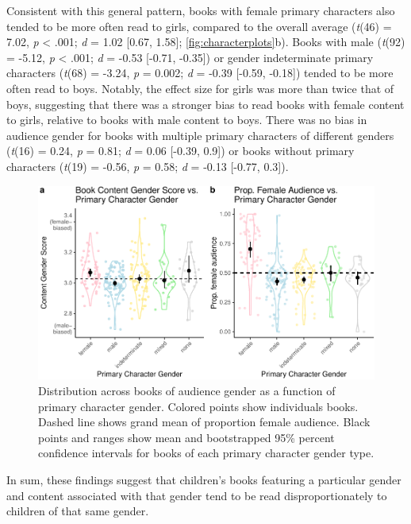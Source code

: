 \documentclass[
  english,
  ,man,floatsintext]{apa6}
\begin{document}
Consistent with this general pattern, books with female primary characters also tended to be more often read to girls, compared to the overall average (\emph{t}(46) = 7.02, \emph{p} \textless{} .001; \emph{d} = 1.02 {[}0.67, 1.58{]}; \autoref{fig:characterplots}b). Books with male (\emph{t}(92) = -5.12, \emph{p} \textless{} .001; \emph{d} = -0.53 {[}-0.71, -0.35{]}) or gender indeterminate primary characters (\emph{t}(68) = -3.24, \emph{p} = 0.002; \emph{d} = -0.39 {[}-0.59, -0.18{]}) tended to be more often read to boys. Notably, the effect size for girls was more than twice that of boys, suggesting that there was a stronger bias to read books with female content to girls, relative to books with male content to boys. There was no bias in audience gender for books with multiple primary characters of different genders (\emph{t}(16) = 0.24, \emph{p} = 0.81; \emph{d} = 0.06 {[}-0.39, 0.9{]}) or books without primary characters (\emph{t}(19) = -0.56, \emph{p} = 0.58; \emph{d} = -0.13 {[}-0.77, 0.3{]}).

\begin{figure}[t!]
\includegraphics{kidbookgender_psych_sci_files/figure-latex/characterplots-1} \caption{Distribution across books of audience gender as a function of primary character gender. Colored points show individuals books. Dashed line shows grand mean of proportion female audience. Black points and ranges show mean and bootstrapped 95\% percent confidence intervals for books of each primary character gender type.}\label{fig:characterplots}
\end{figure}

In sum, these findings suggest that children's books featuring a particular gender and content associated with that gender tend to be read disproportionately to children of that same gender.
\end{document}
